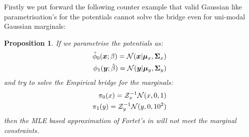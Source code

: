 \documentclass[a4paper,12pt,twoside,openright]{report}
\newtheorem{proposition}[theorem]{Proposition}
\theoremstyle{definition}
\begin{document}
Firstly we put forward the following counter example that valid Gaussian like parametrisation's for the potentials cannot solve the bridge even for uni-modal Gaussian marginals:
\begin{proposition}
If we parametrise the potentials as:
\begin{align}
{\hat{\phi}}_0( {\bm{x}} ; \beta) =  {\mathcal{N}}({\bm{x}} | {\bm{\mu}}_x, {\bm{\Sigma}}_x) \\
\phi_1( {\bm{y}} ; \hat{\beta}) =  {\mathcal{N}}({\bm{y}} | {\bm{\mu}}_y, {\bm{\Sigma}}_y) 
\end{align}
and try to solve the Empirical bridge for the marginals:
\begin{align*}
    \pi_0(x) =  \mathcal{Z}_x^{-1}{\mathcal{N}}(x,0, 1) \\
    \pi_1(y) = \mathcal{Z}_y^{-1} {\mathcal{N}}(y,0, 10^2) 
\end{align*}
then the MLE based approximation of Fortet's in \cite{pavon2018data} will not meet the marginal constraints.
\end{proposition}
\end{document}
